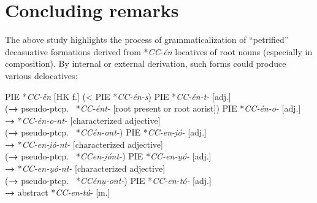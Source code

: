 \documentclass[output=paper,colorlinks,citecolor=brown]{langscibook}
\begin{document}
\section{Concluding remarks} 
\largerpage

The above study highlights the process of grammaticalization of “petrified” decasuative formations derived from *\textit{CC}-\textit{én} locatives of root nouns (especially in composition). By internal or external derivation, such forms could produce various delocatives: 

\begin{exe}
    \ex \begin{xlist} \ex  PIE *\textit{CC-ḗn}   [HK f.] (< PIE *\textit{CC-én-s}) \label{ex:1a}
\ex  PIE *\textit{CC-én-t-}  [adj.]\\\null \hspace{0.5cm} (\textbf{→} pseudo-ptcp.\  *\textit{CC-ént-}    [root present or root aorist])
\ex PIE *\textit{CC-én-o-}  [adj.]\\\null   \hspace{0.5cm} \textbf{→} *\textit{CC-én-o-nt-}  [characterized adjective]\\ \null \hspace{1cm} (\textbf{→} pseudo-ptcp.\  *\textit{CCén-ont-})
\ex PIE *\textit{CC-en-i̯ó-}  [adj.]\\\null  \hspace{0.5cm} \textbf{→} *\textit{CC-en-i̯ó-nt-}  [characterized adjective]\\ \null \hspace{1cm} (\textbf{→} pseudo-ptcp.\  *\textit{CCen-i̯ónt-})
\ex PIE *\textit{CC-en-u̯ó-}   [adj.]\\\null  \hspace{0.5cm} \textbf{→} *\textit{CC-en-u̯ó-nt-}  [characterized adjective]\\ \null  \hspace{1cm} (\textbf{→} pseudo-ptcp.\  *\textit{CCénu̯-ont-}) \label{ex:1e}
\ex PIE *\textit{CC-en-tó-}   [adj.]\\ \null  \hspace{0.5cm} \textbf{→} abstract *\textit{CC-en-tú}-  [m.]
\end{xlist}
\end{exe}
\end{document}
